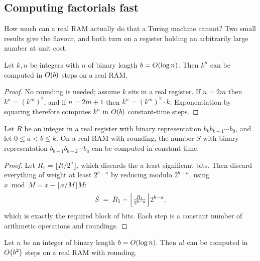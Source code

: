 \subsection{Computing factorials fast}

How much can a real RAM actually do that a Turing machine cannot? Two small
results give the flavour, and both turn on a register holding an arbitrarily
large number at unit cost.

\begin{lemma}\label{lem:real-ram-power}
Let $k, n$ be integers with $n$ of binary length $b = O\!\left(\log n\right)$. Then
$k^n$ can be computed in $O\!\left(b\right)$ steps on a real RAM.
\end{lemma}

\begin{proof}
No rounding is needed; assume $k$ sits in a real register. If $n = 2m$ then
$k^n = (k^m)^2$, and if $n = 2m+1$ then $k^n = (k^m)^2 \cdot k$. Exponentiation
by squaring therefore computes $k^n$ in $O\!\left(b\right)$ constant-time steps.
\end{proof}

\begin{lemma}\label{lem:real-ram-bits}
Let $R$ be an integer in a real register with binary representation
$b_k b_{k-1} \cdots b_0$, and let $0 \le a < b \le k$. On a real RAM with
rounding, the number $S$ with binary representation
$b_{b-1} b_{b-2} \cdots b_a$ can be computed in constant time.
\end{lemma}

\begin{proof}
Let $R_1 = \bigl\lfloor R/2^a \bigr\rfloor$, which discards the $a$ least
significant bits. Then discard everything of weight at least $2^{b-a}$ by
reducing modulo $2^{b-a}$, using $x \bmod M = x - \lfloor x/M \rfloor M$:
\[ S \;=\; R_1 - \Bigl\lfloor \tfrac{R_1}{2^{b-a}} \Bigr\rfloor 2^{b-a}, \]
which is exactly the required block of bits. Each step is a constant number of
arithmetic operations and roundings.
\end{proof}

\begin{lemma}\label{lem:real-ram-factorial}
Let $n$ be an integer of binary length $b = O\!\left(\log n\right)$. Then $n!$ can be
computed in $O\!\left(b^2\right)$ steps on a real RAM with rounding.
\end{lemma}

